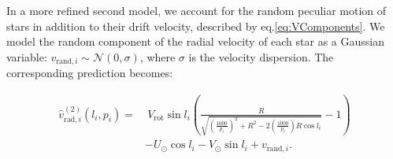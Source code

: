 In a more refined second model, we account for the random peculiar motion of stars in addition to their drift velocity, described by eq.\ref{eq:VComponents}. We model the random component of the radial velocity of each star as a Gaussian variable: $v_{\text{rand},i} \sim \mathcal{N}(0, \sigma)$, where $\sigma$ is the velocity dispersion. The corresponding prediction becomes:

\begin{equation}\label{eq:VradModel2}
    \begin{aligned}
        \hat{v}_{\text{rad},i}^{(2)}(l_i, p_i) = &~V_{\text{rot}} \sin l_i \left( \frac{R}{\sqrt{\left(\frac{1000}{p_i}\right)^2 + R^2 - 2 \left(\frac{1000}{p_i}\right) R \cos l_i}} - 1 \right) \\
        &- U_{\odot} \cos l_i - V_{\odot} \sin l_i + v_{\text{rand},i}.
    \end{aligned}
\end{equation}
